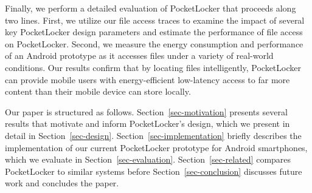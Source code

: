 Finally, we perform a detailed evaluation of PocketLocker that proceeds along
two lines. First, we utilize our file access traces to examine the impact of
several key PocketLocker design parameters and estimate the performance of
file access on PocketLocker. Second, we measure the energy consumption and
performance of an Android prototype as it accesses files under a variety of
real-world conditions. Our results confirm that by locating files
intelligently, PocketLocker can provide mobile users with energy-efficient
low-latency access to far more content than their mobile device can store
locally.

Our paper is structured as follows. Section~\ref{sec-motivation} presents
several results that motivate and inform PocketLocker's design, which we
present in detail in Section~\ref{sec-design}.
Section~\ref{sec-implementation} briefly describes the implementation of our
current PocketLocker prototype for Android smartphones, which we evaluate in
Section~\ref{sec-evaluation}. Section~\ref{sec-related} compares PocketLocker
to similar systems before Section~\ref{sec-conclusion} discusses future work
and concludes the paper.
